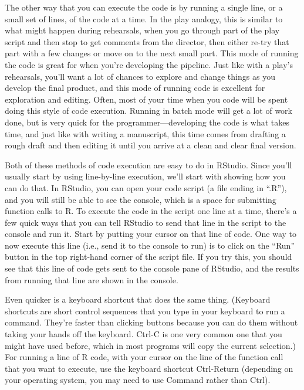 \documentclass[]{tufte-book}
\begin{document}
The other way that you can execute the code is by running a single line, or a
small set of lines, of the code at a time. In the play analogy, this is similar
to what might happen during rehearsals, when you go through part of the play
script and then stop to get comments from the director, then either re-try that
part with a few changes or move on to the next small part. This mode of running
the code is great for when you're developing the pipeline. Just like with a
play's rehearsals, you'll want a lot of chances to explore and change things as
you develop the final product, and this mode of running code is excellent for
exploration and editing. Often, most of your time when you code will be spent
doing this style of code execution. Running in batch mode will get a lot of work
done, but is very quick for the programmer---developing the code is what takes
time, and just like with writing a manuscript, this time comes from drafting a
rough draft and then editing it until you arrive at a clean and clear final
version.

Both of these methods of code execution are easy to do in RStudio. Since you'll
usually start by using line-by-line execution, we'll start with showing how you
can do that. In RStudio, you can open your code script (a file ending in ``.R''),
and you will still be able to see the console, which is a space for submitting
function calls to R. To execute the code in the script one line at a time,
there's a few quick ways that you can tell RStudio to send that line in the
script to the console and run it. Start by putting your cursor on that line of code.
One way to now execute this line (i.e., send it to the console to run) is to
click on the ``Run'' button in the top right-hand corner of the script file. If
you try this, you should see that this line of code gets sent to the console
pane of RStudio, and the results from running that line are shown in the
console.

Even quicker is a keyboard shortcut that does the same thing. (Keyboard
shortcuts are short control sequences that you type in your keyboard to run a
command. They're faster than clicking buttons because you can do them without
taking your hands off the keyboard. Ctrl-C is one very common one that you might
have used before, which in most programs will copy the current selection.) For
running a line of R code, with your cursor on the line of the function call that
you want to execute, use the keyboard shortcut Ctrl-Return (depending on your
operating system, you may need to use Command rather than Ctrl).
\end{document}

